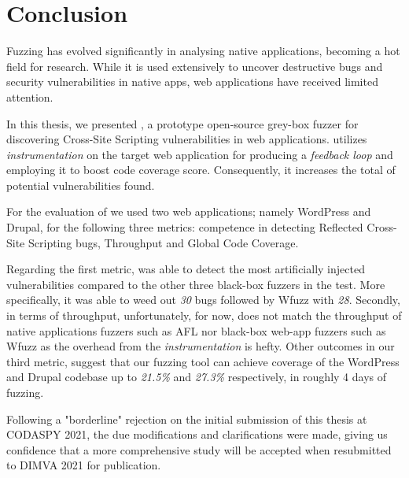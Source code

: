 \chapter{Conclusion}
\label{sec:conclusion}
\vspace*{0.25cm}

Fuzzing has evolved significantly in analysing native applications, becoming a hot field for research. While it is used extensively to uncover destructive bugs and security vulnerabilities in native apps, web applications have received limited attention.

In this thesis, we presented \pname{}, a prototype open-source grey-box fuzzer for discovering Cross-Site Scripting vulnerabilities in web applications. \pname{} utilizes \emph{instrumentation} on the target web application for producing a \emph{feedback loop} and employing it to boost code coverage score. Consequently, it increases the total of potential vulnerabilities found.

For the evaluation of \pname{} we used two web applications; namely WordPress and Drupal, for the following three metrics: competence in detecting Reflected Cross-Site Scripting bugs, Throughput and Global Code Coverage.

Regarding the first metric, \pname{} was able to detect the most artificially injected vulnerabilities compared to the other three black-box fuzzers in the test. More specifically, it was able to weed out \emph{30} bugs followed by Wfuzz with \emph{28}. Secondly, in terms of throughput, unfortunately, for now, \pname{} does not match the throughput of native applications fuzzers such as AFL nor black-box web-app fuzzers such as Wfuzz as the overhead from the \emph{instrumentation} is hefty. Other outcomes in our third metric, suggest that our fuzzing tool can achieve coverage of the WordPress and Drupal codebase up to \emph{21.5\%} and \emph{27.3\%} respectively, in roughly 4 days of fuzzing.

Following a "borderline" rejection on the initial submission of this thesis at CODASPY 2021, the due modifications and clarifications were made, giving us confidence that a more comprehensive study will be accepted when resubmitted to DIMVA 2021 for publication.